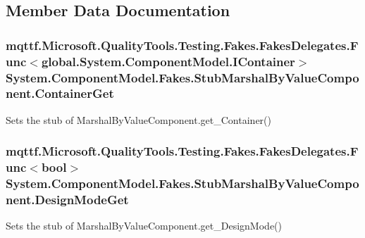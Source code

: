 \subsection{Member Data Documentation}
\hypertarget{class_system_1_1_component_model_1_1_fakes_1_1_stub_marshal_by_value_component_a76f5e2aae558dd5144a9233ed80d687c}{
\subsubsection[{Container\-Get}]{\setlength{\rightskip}{0pt plus 5cm}mqttf.\-Microsoft.\-Quality\-Tools.\-Testing.\-Fakes.\-Fakes\-Delegates.\-Func$<$global.\-System.\-Component\-Model.\-I\-Container$>$ System.\-Component\-Model.\-Fakes.\-Stub\-Marshal\-By\-Value\-Component.\-Container\-Get}}\label{class_system_1_1_component_model_1_1_fakes_1_1_stub_marshal_by_value_component_a76f5e2aae558dd5144a9233ed80d687c}


Sets the stub of Marshal\-By\-Value\-Component.\-get\-\_\-\-Container()

\hypertarget{class_system_1_1_component_model_1_1_fakes_1_1_stub_marshal_by_value_component_a138b4fd142abdac7e10c03e79f79ee0e}{
\subsubsection[{Design\-Mode\-Get}]{\setlength{\rightskip}{0pt plus 5cm}mqttf.\-Microsoft.\-Quality\-Tools.\-Testing.\-Fakes.\-Fakes\-Delegates.\-Func$<$bool$>$ System.\-Component\-Model.\-Fakes.\-Stub\-Marshal\-By\-Value\-Component.\-Design\-Mode\-Get}}\label{class_system_1_1_component_model_1_1_fakes_1_1_stub_marshal_by_value_component_a138b4fd142abdac7e10c03e79f79ee0e}


Sets the stub of Marshal\-By\-Value\-Component.\-get\-\_\-\-Design\-Mode()

